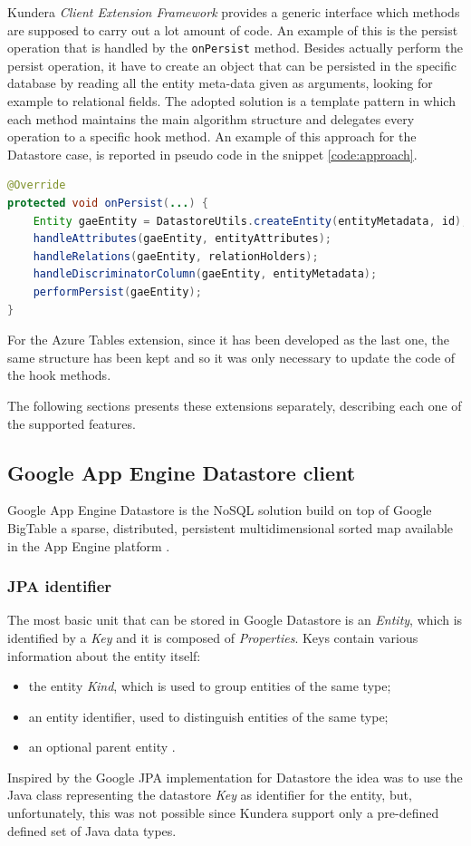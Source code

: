\noindent Kundera \textit{Client Extension Framework} provides a generic interface which methods are supposed to carry out a lot amount of code. An example of this is the persist operation that is handled by the \texttt{onPersist} method. Besides actually perform the persist operation, it have to create an object that can be persisted in the specific database by reading all the entity meta-data given as arguments, looking for example to relational fields.
\noindent The adopted solution is a template pattern in which each method maintains the main algorithm structure and delegates every operation to a specific hook method.
An example of this approach for the Datastore case, is reported in pseudo code in the snippet \ref{code:approach}.

\begin{lstlisting}[language=Java, caption=Template for the persist operation, label=code:approach]
@Override
protected void onPersist(...) {
    Entity gaeEntity = DatastoreUtils.createEntity(entityMetadata, id);
    handleAttributes(gaeEntity, entityAttributes);
    handleRelations(gaeEntity, relationHolders);
    handleDiscriminatorColumn(gaeEntity, entityMetadata);
    performPersist(gaeEntity);
}
\end{lstlisting}

\noindent For the Azure Tables extension, since it has been developed as the last one, the same structure has been kept and so it was only necessary to update the code of the hook methods.

\noindent The following sections presents these extensions separately, describing each one of the supported features.

\subsection{Google App Engine Datastore client}
\label{sec:kundera-datastore}
Google App Engine Datastore \cite{online:datastore} is the NoSQL solution build on top of Google BigTable a sparse, distributed, persistent multidimensional sorted map available in the App Engine platform \cite{paper:bigtable}. 

\subsubsection{JPA identifier}
The most basic unit that can be stored in Google Datastore is an \textit{Entity}, which is identified by a \textit{Key} and it is composed of \textit{Properties}.
Keys contain various information about the entity itself:
\begin{itemize}
\item the entity \textit{Kind}, which is used to group entities of the same type;
\item an entity identifier, used to distinguish entities of the same type;
\item an optional parent entity .
\end{itemize}
Inspired by the Google JPA implementation for Datastore \cite{online:googlejpa} the idea was to use the Java class representing the datastore \textit{Key} as identifier for the entity, but, unfortunately, this was not possible since Kundera support only a pre-defined defined set of Java data types.

